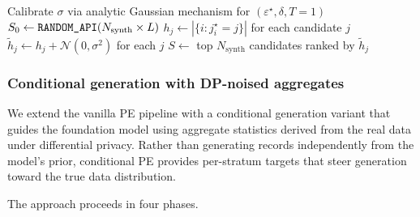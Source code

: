 \documentclass[12pt,letterpaper]{article}
\renewcommand{\_}{\textunderscore\allowbreak}
\begin{document}
\begin{algorithm}[ht]
\caption{Private Evolution for tabular data ($T = 1$)}
\label{alg:pe}
Calibrate $\sigma$ via analytic Gaussian mechanism \citep{balle2018improving} for $(\varepsilon^\star, \delta, T{=}1)$\;
$S_0 \gets \texttt{RANDOM\_API}(N_{\text{synth}} \times L)$
$h_j \gets |\{i : j^\star_i = j\}|$ for each candidate $j$
$\tilde{h}_j \gets h_j + \mathcal{N}(0, \sigma^2)$ for each $j$
$S \gets$ top $N_{\text{synth}}$ candidates ranked by $\tilde{h}_j$
\end{algorithm}

\subsubsection{Conditional generation with DP-noised aggregates}
\label{sec:methods-cond-pe}

We extend the vanilla PE pipeline with a conditional generation variant that guides the foundation model using aggregate statistics derived from the real data under differential privacy. Rather than generating records independently from the model's prior, conditional PE provides per-stratum targets that steer generation toward the true data distribution.

The approach proceeds in four phases.
\end{document}
